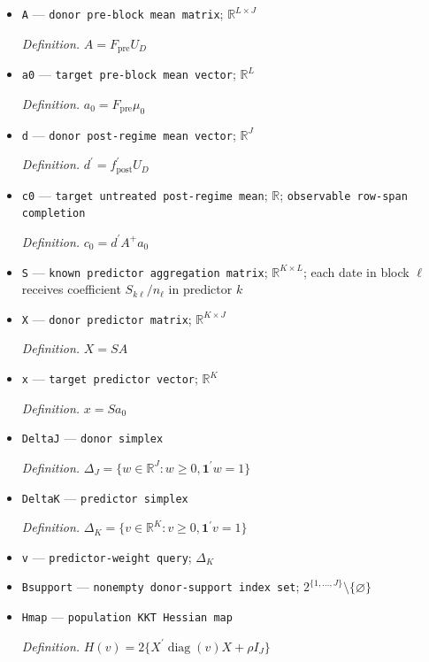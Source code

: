 \documentclass{article}
\begin{document}
\begin{itemize}
  \item \texttt{A} --- \texttt{donor pre-\allowbreak{}block mean matrix}; \(\mathbb R^{L\times J}\)
  \par\smallskip\noindent\emph{Definition.} \(A=F_{\mathrm{pre}}U_D\)
  \item \texttt{a0} --- \texttt{target pre-\allowbreak{}block mean vector}; \(\mathbb R^L\)
  \par\smallskip\noindent\emph{Definition.} \(a_0=F_{\mathrm{pre}}\mu_0\)
  \item \texttt{d} --- \texttt{donor post-\allowbreak{}regime mean vector}; \(\mathbb R^J\)
  \par\smallskip\noindent\emph{Definition.} \(d^{\prime}=f_{\mathrm{post}}^{\prime}U_D\)
  \item \texttt{c0} --- \texttt{target untreated post-\allowbreak{}regime mean}; \(\mathbb R\); \texttt{observable row-\allowbreak{}span completion}
  \par\smallskip\noindent\emph{Definition.} \(c_0=d^{\prime}A^{+}a_0\)
  \item \texttt{S} --- \texttt{known predictor aggregation matrix}; \(\mathbb R^{K\times L}\); each date in block \(\ell\) receives coefficient \(S_{k\ell}/n_\ell\) in predictor \(k\)
  \item \texttt{X} --- \texttt{donor predictor matrix}; \(\mathbb R^{K\times J}\)
  \par\smallskip\noindent\emph{Definition.} \(X=SA\)
  \item \texttt{x} --- \texttt{target predictor vector}; \(\mathbb R^K\)
  \par\smallskip\noindent\emph{Definition.} \(x=Sa_0\)
  \item \texttt{DeltaJ} --- \texttt{donor simplex}
  \par\smallskip\noindent\emph{Definition.} \(\Delta_J=\{w\in\mathbb R^J:w\ge0,\mathbf 1^{\prime}w=1\}\)
  \item \texttt{DeltaK} --- \texttt{predictor simplex}
  \par\smallskip\noindent\emph{Definition.} \(\Delta_K=\{v\in\mathbb R^K:v\ge0,\mathbf 1^{\prime}v=1\}\)
  \item \texttt{v} --- \texttt{predictor-\allowbreak{}weight query}; \(\Delta_K\)
  \item \texttt{Bsupport} --- \texttt{nonempty donor-\allowbreak{}support index set}; \(2^{\{1,\ldots,J\}}\setminus\{\varnothing\}\)
  \item \texttt{Hmap} --- \texttt{population KKT Hessian map}
  \par\smallskip\noindent\emph{Definition.} \(H(v)=2\{X^{\prime}\operatorname{diag}(v)X+\rho I_J\}\)

\end{itemize}
\end{document}
